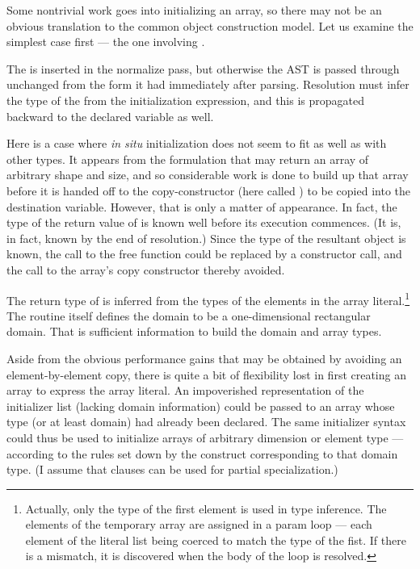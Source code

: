 Some nontrivial work goes into initializing an array, so there may not be an obvious
translation to the common object construction model.  Let us examine the simplest case
first --- the one involving .

The  is inserted in the normalize pass, but otherwise the AST is passed
through unchanged from the form it had immediately after parsing.  Resolution must infer the type of the
 from the initialization expression, and this is propagated backward to the
declared variable as well.

Here is a case where \emph{in situ} initialization does not seem to fit as well as with other
types.  It appears from the formulation that  may return an
array of arbitrary shape and size, and so considerable work is done to build up that array
before it is handed off to the copy-constructor (here called ) to be
copied into the destination variable.  However, that is only a matter of appearance.  In
fact, the type of the return value of  is known well before
its execution commences.  (It is, in fact, known by the end of resolution.)  Since
the type of the resultant object is known, the call to the free function
 could be replaced by a constructor call, and the call to the
array's copy constructor thereby avoided.

The return type of  is inferred from the types of the
elements in the array literal.\footnote{Actually, only the type of the first element is
  used in type inference.  The elements of the temporary array are assigned in a param
  loop --- each element of the literal list being coerced to match the type of the fist.
  If there is a mismatch, it is discovered when the body of the loop is resolved.}  The
routine itself defines the domain to be a one-dimensional rectangular domain.  That is
sufficient information to build the domain and array types.

Aside from the obvious performance gains that may be obtained by avoiding an
element-by-element copy, there is quite a bit of flexibility lost in first creating an
array to express the array literal.  An impoverished representation of the initializer
list (lacking domain information) could be passed to an array whose type (or at least
domain) had already been declared.  The same initializer syntax could thus be used to
initialize arrays of arbitrary dimension or element type --- according to the rules set
down by the construct corresponding to that domain type.  (I assume that 
clauses can be used for partial specialization.)  

